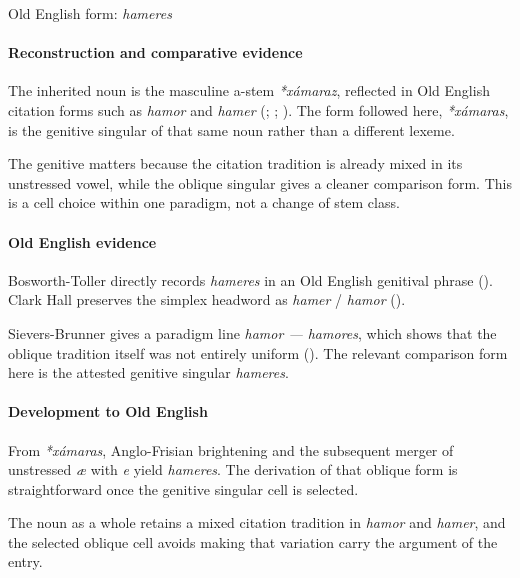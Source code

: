 \documentclass[
  british,
  a4paper,
]{article}
\begin{document}
Old English form: \emph{hameres}

\paragraph{Reconstruction and comparative
evidence}\label{reconstruction-and-comparative-evidence-45}

The inherited noun is the masculine a-stem \emph{*xámaraz}, reflected in
Old English citation forms such as \emph{hamor} and \emph{hamer}
(;
;
). The form followed
here, \emph{*xámaras}, is the genitive singular of that same noun rather
than a different lexeme.

The genitive matters because the citation tradition is already mixed in
its unstressed vowel, while the oblique singular gives a cleaner
comparison form. This is a cell choice within one paradigm, not a change
of stem class.

\paragraph{Old English evidence}\label{old-english-evidence-45}

Bosworth-Toller directly records \emph{hameres} in an Old English
genitival phrase (). Clark Hall preserves the simplex headword as \emph{hamer} /
\emph{hamor} ().

Sievers-Brunner gives a paradigm line \emph{hamor --- hamores}, which
shows that the oblique tradition itself was not entirely uniform
(). The
relevant comparison form here is the attested genitive singular
\emph{hameres}.

\paragraph{Development to Old
English}\label{development-to-old-english-45}

From \emph{*xámaras}, Anglo-Frisian brightening and the subsequent
merger of unstressed \emph{æ} with \emph{e} yield \emph{hameres}. The
derivation of that oblique form is straightforward once the genitive
singular cell is selected.

The noun as a whole retains a mixed citation tradition in \emph{hamor}
and \emph{hamer}, and the selected oblique cell avoids making that
variation carry the argument of the entry.
\end{document}
